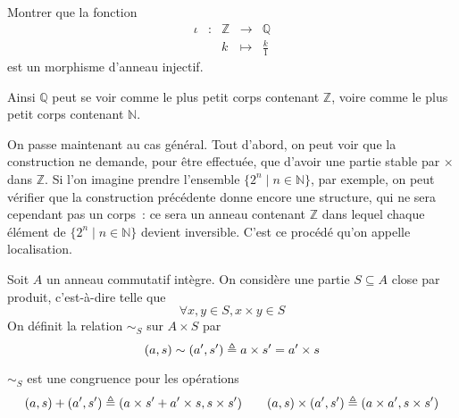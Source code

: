 \begin{exercise}
  Montrer que la fonction
  \[\begin{array}{ccccc}
  \iota &: & \mathbb Z & \longrightarrow & \mathbb Q \\
  & & k & \longmapsto & \frac{k}{1}
  \end{array}\]
  est un morphisme d'anneau injectif.
\end{exercise}

Ainsi $\mathbb Q$ peut se voir comme le plus petit corps contenant $\mathbb Z$,
voire comme le plus petit corps contenant $\mathbb N$.

On passe maintenant au cas général. Tout d'abord, on peut voir que la
construction ne demande, pour être effectuée, que d'avoir une partie stable
par $\times$ dans $\mathbb Z$. Si l'on imagine prendre l'ensemble
$\{2^n\mid n \in \mathbb N\}$, par exemple, on peut vérifier que la
construction précédente donne encore une structure, qui ne sera cependant pas
un corps~: ce sera un anneau contenant $\mathbb Z$ dans lequel chaque élément
de $\{2^n \mid n \in \mathbb N\}$ devient inversible. C'est ce procédé qu'on
appelle localisation.

\begin{definition}
  Soit $A$ un anneau commutatif intègre. On considère une partie $S\subseteq A$
  close par produit, c'est-à-dire telle que
  \[\forall x,y\in S, x \times y \in S\]
  On définit la relation $\sim_S$ sur $A\times S$ par
  \[(a,s) \sim (a',s') \triangleq a\times s' = a' \times s\]
\end{definition}

\begin{proposition}
  $\sim_S$ est une congruence pour les opérations
  \[(a,s)+(a',s') \triangleq (a\times s' + a' \times s, s\times s')\qquad
  (a,s)\times (a',s') \triangleq (a\times a',s\times s')\]
\end{proposition}

